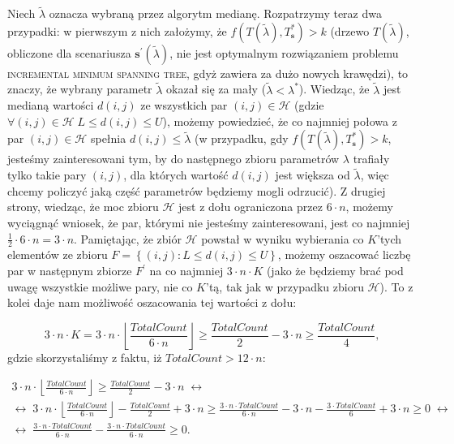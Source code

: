 Niech $\tilde{\lambda}$ oznacza wybraną przez algorytm medianę. Rozpatrzymy teraz dwa przypadki: w pierwszym z nich założymy, że $f \left( T \left( \tilde{\lambda} \right), T^{\ast}_{\textbf{s}} \right) > k$ (drzewo $T \left( \tilde{\lambda} \right)$, obliczone dla scenariusza $\textbf{s}^{\prime} \left( \tilde{\lambda} \right)$, nie jest optymalnym rozwiązaniem problemu \textsc{incremental minimum spanning tree}, gdyż zawiera za dużo nowych krawędzi), to znaczy, że wybrany parametr $\tilde{\lambda}$ okazał się za mały ($\tilde{\lambda} < \lambda^{\ast}$). Wiedząc, że $\tilde{\lambda}$ jest medianą wartości $d \left( i, j \right)$ ze wszystkich par $\left( i, j \right) \in \mathcal{H}$ (gdzie $\forall \left( i, j \right) \in \mathcal{H} \; L \leqslant d \left( i, j \right) \leqslant U$), możemy powiedzieć, że co najmniej połowa z par $\left( i, j \right) \in \mathcal{H}$ spełnia $d \left( i, j \right) \leqslant \tilde{\lambda}$ (w przypadku, gdy $f \left( T \left( \tilde{\lambda} \right), T^{\ast}_{\textbf{s}} \right) > k$, jesteśmy zainteresowani tym, by do następnego zbioru parametrów $\lambda$ trafiały tylko takie pary $\left( i, j \right)$, dla których wartość $d \left( i, j \right)$ jest większa od $\tilde{\lambda}$, więc chcemy policzyć jaką część parametrów będziemy mogli odrzucić). Z drugiej strony, wiedząc, że moc zbioru $\mathcal{H}$ jest z dołu ograniczona przez $6 \cdot n$, możemy wyciągnąć wniosek, że par, którymi nie jesteśmy zainteresowani, jest co najmniej $\frac{1}{2} \cdot 6 \cdot n = 3 \cdot n$. Pamiętając, że zbiór $\mathcal{H}$ powstał w wyniku wybierania co $K$'tych elementów ze zbioru $F = \left\{ \left(i, j \right) : L \leqslant d \left( i, j \right) \leqslant U \right\}$, możemy oszacować liczbę par w następnym zbiorze $F^{\prime}$ na co najmniej $3 \cdot n \cdot K$ (jako że będziemy brać pod uwagę wszystkie możliwe pary, nie co $K$'tą, tak jak w przypadku zbioru $\mathcal{H}$). To z kolei daje nam możliwość oszacowania tej wartości z dołu:

\begin{equation}\label{eq:Hset1}
	3 \cdot n \cdot K = 3 \cdot n \cdot \left\lfloor \frac{TotalCount}{6 \cdot n} \right\rfloor \geqslant \frac{TotalCount}{2} - 3 \cdot n \geqslant \frac{TotalCount}{4}\text{,}
\end{equation}
gdzie skorzystaliśmy z faktu, iż $TotalCount > 12 \cdot n$:

\begin{gather*}
	3 \cdot n \cdot \left\lfloor \frac{TotalCount}{6 \cdot n} \right\rfloor \geqslant \frac{TotalCount}{2} - 3 \cdot n \; \leftrightarrow \\
	\leftrightarrow \; 3 \cdot n \cdot \left\lfloor \frac{TotalCount}{6 \cdot n} \right\rfloor - \frac{TotalCount}{2} + 3 \cdot n \geqslant \frac{3 \cdot n \cdot TotalCount}{6 \cdot n} - 3 \cdot n - \frac{3 \cdot TotalCount}{6} + 3 \cdot n \geqslant 0 \; \leftrightarrow \\
	\leftrightarrow \; \frac{3 \cdot n \cdot TotalCount}{6 \cdot n} -  \frac{3 \cdot n \cdot TotalCount}{6 \cdot n} \geqslant 0\text{.}
\end{gather*}

